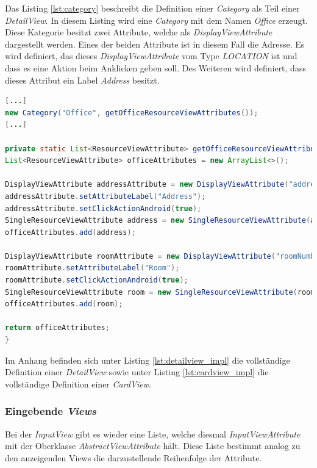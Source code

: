 Das Listing \ref{lst:category} beschreibt die Definition einer \textit{Category} als Teil einer \textit{DetailView}. In diesem Listing wird eine \textit{Category} mit dem Namen \textit{Office} erzeugt. Diese Kategorie besitzt zwei Attribute, welche als \textit{DisplayViewAttribute} dargestellt werden. Eines der beiden Attribute ist in diesem Fall die Adresse. Es wird definiert, das dieses \textit{DisplayViewAttribute} vom Type \textit{LOCATION} ist und dass es eine Aktion beim Anklicken geben soll. Des Weiteren wird definiert, dass dieses Attribut ein Label \textit{Address} besitzt.

\newpage

\begin{lstlisting}[label=lst:category,
language=java,
firstnumber=1,
caption=Erstellung einer \textit{Category}.]		
[...]
new Category("Office", getOfficeResourceViewAttributes());
[...]

private static List<ResourceViewAttribute> getOfficeResourceViewAttributes() {
List<ResourceViewAttribute> officeAttributes = new ArrayList<>();

DisplayViewAttribute addressAttribute = new DisplayViewAttribute("address", ViewAttribute.AttributeType.LOCATION);
addressAttribute.setAttributeLabel("Address");
addressAttribute.setClickActionAndroid(true);
SingleResourceViewAttribute address = new SingleResourceViewAttribute(addressAttribute);
officeAttributes.add(address);

DisplayViewAttribute roomAttribute = new DisplayViewAttribute("roomNumber", ViewAttribute.AttributeType.TEXT);
roomAttribute.setAttributeLabel("Room");
roomAttribute.setClickActionAndroid(true);
SingleResourceViewAttribute room = new SingleResourceViewAttribute(roomAttribute);
officeAttributes.add(room);

return officeAttributes;
}
\end{lstlisting}

Im Anhang befinden sich unter Listing \ref{lst:detailview_impl} die vollständige Definition einer \textit{DetailView} sowie unter Listing \ref{lst:cardview_impl} die vollständige Definition einer \textit{CardView}. 

\subsubsection{Eingebende \textit{Views}}

Bei der \textit{InputView} gibt es wieder eine Liste, welche diesmal \textit{InputViewAttribute} mit der Oberklasse \textit{AbstractViewAttribute} hält. Diese Liste bestimmt analog zu den anzeigenden Views die darzustellende Reihenfolge der Attribute. 

